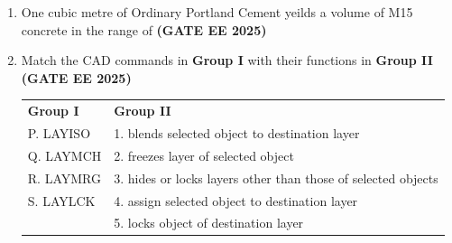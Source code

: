 \documentclass[journal,12pt,onecolumn]{IEEEtran}
\theoremstyle{remark}
\begin{document}
{\begin{enumerate}
\begin{enumerate}
\end{enumerate}
\item One cubic metre of Ordinary Portland Cement yeilds a volume of M15 concrete in the range of \hfill \textbf{(GATE EE 2025)}
\begin{enumerate}
\end{enumerate}
\item Match the CAD commands in \textbf{Group I} with their functions in \textbf{Group II} \hfill \textbf{(GATE EE 2025)}
\\
\begin{tabular}{p{}p{}}
\textbf{Group I}     & \textbf{Group II} \\
 P. LAYISO    & 1. blends selected object to destination layer\\
 Q. LAYMCH  & 2. freezes layer of selected object\\
 R. LAYMRG  & 3. hides or locks layers other than those of selected objects\\
 S. LAYLCK  & 4. assign selected object to destination layer\\
       & 5. locks object of destination layer\\
\end{tabular}
\begin{enumerate}
\end{enumerate}

\end{enumerate}}
\end{document}
